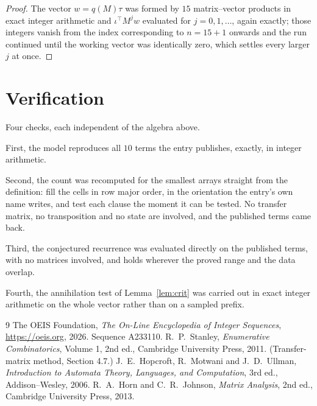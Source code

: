 \documentclass[11pt,a4paper]{article}
\theoremstyle{plain}
\theoremstyle{definition}
\begin{document}
\begin{proof}
The vector $w=q(M)\tau$ was formed by $15$ matrix--vector products in exact integer
arithmetic and $\iota^{\!\top}M^{j}w$ evaluated for $j=0,1,\dots$, again exactly; those
integers vanish from the index corresponding to $n=15+1$ onwards and the run continued
until the working vector was identically zero, which settles every larger $j$ at once.
\end{proof}

\section{Verification}

Four checks, each independent of the algebra above.

First, the model reproduces all $10$ terms the entry publishes, exactly, in integer
arithmetic.

Second, the count was recomputed for the smallest arrays straight from the definition: fill the
cells in row major order, in the orientation the entry's own name writes, and test each clause
the moment it can be tested. No transfer matrix, no transposition and no state are involved,
and the published terms came back.

Third, the conjectured recurrence was evaluated directly on the published terms, with no
matrices involved, and holds wherever the proved range and the data overlap.

Fourth, the annihilation test of Lemma~\ref{lem:crit} was carried out in exact integer
arithmetic on the whole vector rather than on a sampled prefix.

\begin{thebibliography}{9}
 The OEIS Foundation, \emph{The On-Line Encyclopedia of Integer
Sequences}, \url{https://oeis.org}, 2026. Sequence A233110.
 R.~P.~Stanley, \emph{Enumerative Combinatorics}, Volume 1, 2nd ed.,
Cambridge University Press, 2011. (Transfer-matrix method, Section 4.7.)
 J.~E.~Hopcroft, R.~Motwani and J.~D.~Ullman, \emph{Introduction to Automata
Theory, Languages, and Computation}, 3rd ed., Addison--Wesley, 2006.
 R.~A.~Horn and C.~R.~Johnson, \emph{Matrix Analysis}, 2nd ed., Cambridge
University Press, 2013.
\end{thebibliography}
\end{document}
